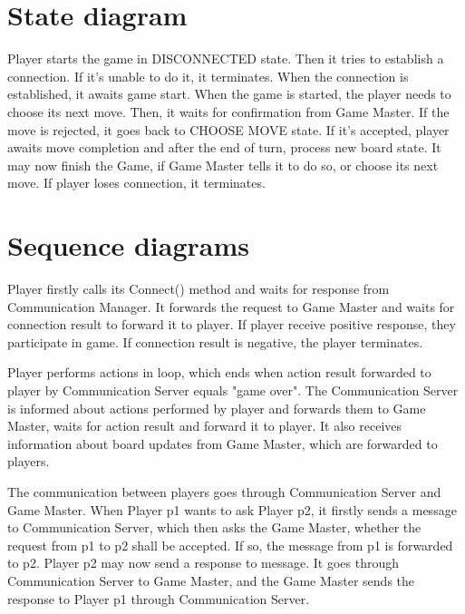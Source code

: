 \documentclass[a4paper]{article}
\begin{document}
\section{State diagram}

Player starts the game in DISCONNECTED state. Then it tries to establish a connection. If it's unable to do it, it terminates. When the connection is established, it awaits game start. When the game is started, the player needs to choose its next move. Then, it waits for confirmation from Game Master. If the move is rejected, it goes back to CHOOSE MOVE state. If it's accepted, player awaits move completion and after the end of turn, process new board state. It may now finish the Game, if Game Master tells it to do so, or choose its next move. If player loses connection, it terminates.
\newpage
\section{Sequence diagrams}

Player firstly calls its Connect() method and waits for response from Communication Manager. It forwards the request to Game Master and waits for connection result to forward it to player. If player receive positive response, they participate in game. If connection result is negative, the player terminates.

Player performs actions in loop, which ends when action result forwarded to player by Communication Server equals "game over". The Communication Server is informed about actions performed by player and forwards them to Game Master, waits for action result and forward it to player. It also receives information about board updates from Game Master, which are forwarded to players.

The communication between players goes through Communication Server and Game Master. When Player p1 wants to ask Player p2, it firstly sends a message to Communication Server, which then asks the Game Master, whether the request from p1 to p2 shall be accepted. If so, the message from p1 is forwarded to p2. Player p2 may now send a response to message. It goes through Communication Server to Game Master, and the Game Master sends the response to Player p1 through Communication Server.
\end{document}
